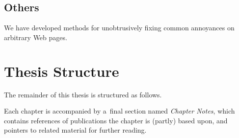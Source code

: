 \subsection{Others}

We have developed methods for unobtrusively fixing
common annoyances on arbitrary Web pages.

\section{Thesis Structure}

The remainder of this thesis is structured as follows. 

Each chapter is accompanied by a~final section named
\emph{Chapter Notes}, which contains references of publications
the chapter is (partly) based upon,
and pointers to related material for further reading.